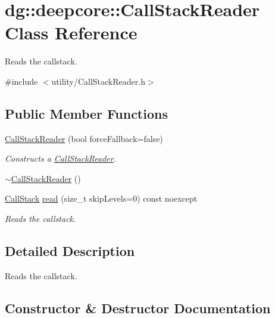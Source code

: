 \hypertarget{classdg_1_1deepcore_1_1_call_stack_reader}{}\section{dg\+:\+:deepcore\+:\+:Call\+Stack\+Reader Class Reference}
\label{classdg_1_1deepcore_1_1_call_stack_reader}


Reads the callstack.  




{\ttfamily \#include $<$utility/\+Call\+Stack\+Reader.\+h$>$}

\subsection*{Public Member Functions}
\begin{DoxyCompactItemize}
\item 
\hyperlink{classdg_1_1deepcore_1_1_call_stack_reader_a9eae863d9981b80813f862aa3ca3eda8}{Call\+Stack\+Reader} (bool force\+Fallback=false)
\begin{DoxyCompactList}\small\item\em Constructs a \hyperlink{classdg_1_1deepcore_1_1_call_stack_reader}{Call\+Stack\+Reader}. \end{DoxyCompactList}\item 
\hyperlink{classdg_1_1deepcore_1_1_call_stack_reader_a2ca85ed337036abaeb59c32c6d050843}{$\sim$\+Call\+Stack\+Reader} ()
\item 
\hyperlink{group___utility_module_gabdf2d70ae3aab3c57142eddec69a725c}{Call\+Stack} \hyperlink{classdg_1_1deepcore_1_1_call_stack_reader_ab0a0af576fa9a5015e29b5a3aa792899}{read} (size\+\_\+t skip\+Levels=0) const noexcept
\begin{DoxyCompactList}\small\item\em Reads the callstack. \end{DoxyCompactList}\end{DoxyCompactItemize}


\subsection{Detailed Description}
Reads the callstack. 

\subsection{Constructor \& Destructor Documentation}

